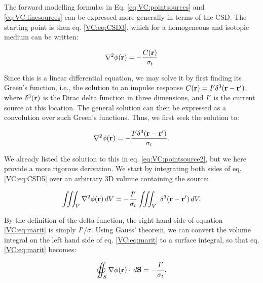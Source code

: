 \subsection{}
\label{sec:VC:CSD}
The forward modelling formulas in Eq. \ref{eq:VC:pointsources} and \ref{eq:VC:linesources} can be expressed more generally in terms of the CSD. The starting point is then eq. \ref{VC:eq:CSD3}, which for a homogeneous and isotopic medium can be written:

\begin{equation}
\nabla^2 \phi({\bf r}) = - \frac{C({\bf r})}{\sigma_t}
\label{VC:eq:CSD4}
\end{equation}

Since this is a linear differential equation, we may solve it by first finding its Green's function, i.e., the solution to an impulse response $C({\bf r}) = I' \delta^3({\bf r-r'})$,
where $\delta^3({\bf r})$ is the Dirac delta function in three dimensions, and $I'$ is the current source at this location. The general solution can then be expressed as a convolution over such Green's functions. Thus, we first seek the solution to:

\begin{equation}
\nabla^2 \phi({\bf r}) = - \frac{I' \delta^3({\bf r-r'})}{\sigma_t}.
\label{VC:eq:CSD5}
\end{equation}

We already listed the solution to this in eq. \ref{eq:VC:pointsource2}, but we here provide a more rigorous derivation. We start by integrating both sides of eq. \ref{VC:eq:CSD5} over an arbitrary 3D volume containing the source:

\begin{equation}
\iiint_V \nabla^2\phi({\bf r}) \,dV =  - \frac{I'}{\sigma_t} \iiint_V \ \delta^3({\bf r-r'}) \, dV,
\label{VC:eq:marit}
\end{equation}

By the definition of the delta-function, the right hand side of equation \ref{VC:eq:marit} is simply $I'/\sigma$. Using Gauss' theorem, we can convert the volume integral on the left hand side of eq. \ref{VC:eq:marit} to a surface integral, so that eq. \ref{VC:eq:marit} becomes:

\begin{equation}
\oiint_{S} \nabla\phi({\bf r}) \cdot \, d{\bf S}  = - \frac{I'}{\sigma_t},
\label{VC:eq:berit1}
\end{equation}

